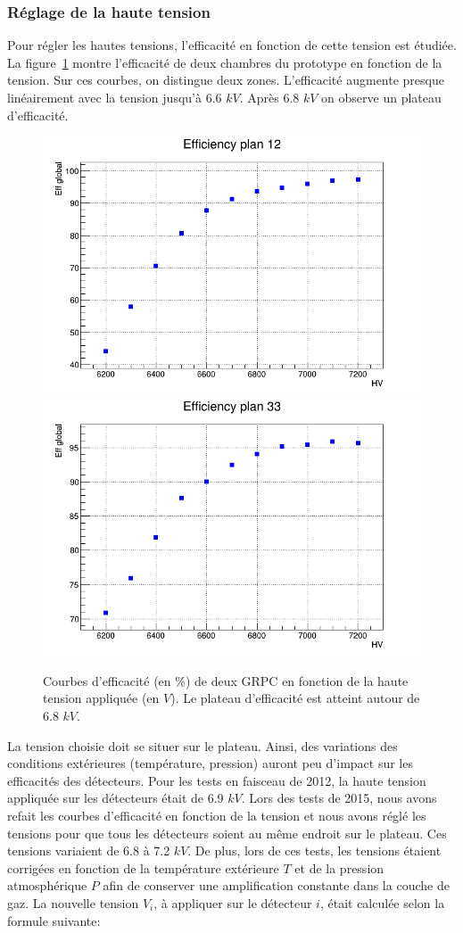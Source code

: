 \subsubsection{Réglage de la haute tension}
Pour régler les hautes tensions, l'efficacité en fonction de cette tension est étudiée. La figure~\ref{fig:plateau} montre l'efficacité de deux chambres du prototype en fonction de la tension. Sur ces courbes, on distingue deux zones. L'efficacité augmente presque linéairement avec la tension jusqu'à 6.6 $kV$. Après 6.8 $kV$ on observe un plateau d'efficacité. 
\begin{figure}[!ht]
  \begin{center}
    \includegraphics[width=.49\textwidth]{SDHCAL/figs/plateau12.png}
    \includegraphics[width=.49\textwidth]{SDHCAL/figs/plateau33.png}
    \caption{Courbes d'efficacité (en $\%$) de deux GRPC en fonction de la haute tension appliquée (en $V$). Le plateau d'efficacité est atteint autour de 6.8 $kV$.}
    \label{fig:plateau}
  \end{center}
\end{figure}
La tension choisie doit se situer sur le plateau. Ainsi, des variations des conditions extérieures (température, pression) auront peu d'impact sur les efficacités des détecteurs. Pour les tests en faisceau de 2012, la haute tension appliquée sur les détecteurs était de 6.9 $kV$. Lors des tests de 2015, nous avons refait les courbes d'efficacité en fonction de la tension et nous avons réglé les tensions pour que tous les détecteurs soient au même endroit sur le plateau. Ces tensions variaient de 6.8 à 7.2 $kV$. De plus, lors de ces tests, les tensions étaient corrigées en fonction de la température extérieure $T$ et de la pression atmosphérique $P$ afin de conserver une amplification constante dans la couche de gaz. La nouvelle tension $V_{i}$, à appliquer sur le détecteur $i$, était calculée selon la formule suivante:
